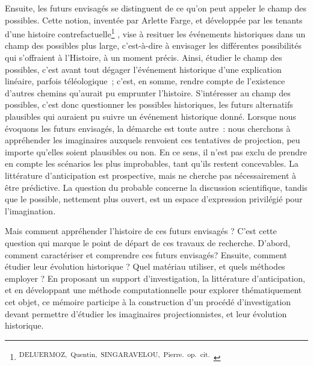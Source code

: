 \documentclass[letterpaper,portrait,12pt]{article}
\begin{document}
	Ensuite, les futurs envisag\'{e}s se distinguent de ce qu'on peut appeler le champ des possibles. Cette notion, invent\'{e}e par Arlette Farge, et d\'{e}velopp\'{e}e par les tenants d'une histoire contrefactuelle\footnote{\textsuperscript{\newpage
}\textsuperscript{	DELUERMOZ,\ Quentin,\ SINGARAVELOU,\ Pierre.\ op.\ cit.\ }} , vise \`{a} resituer les \'{e}v\'{e}nements historiques dans un champ des possibles plus large, c'est-\`{a}-dire \`{a} envisager les diff\'{e}rentes possibilit\'{e}s qui s'offraient \`{a} l'Histoire, \`{a} un moment pr\'{e}cis. Ainsi, \'{e}tudier le champ des possibles, c'est avant tout d\'{e}gager l'\'{e}v\'{e}nement historique d'une explication lin\'{e}aire, parfois t\'{e}l\'{e}ologique ; c'est, en somme, rendre compte de l'existence d'autres chemins qu'aurait pu emprunter l'histoire. S'int\'{e}resser au champ des possibles, c'est donc questionner les possibles historiques, les futurs alternatifs plausibles qui auraient pu suivre un \'{e}v\'{e}nement historique donn\'{e}. Lorsque nous \'{e}voquons les futurs envisag\'{e}s, la d\'{e}marche est toute autre : nous cherchons \`{a} appr\'{e}hender les imaginaires auxquels renvoient ces tentatives de projection, peu importe qu'elles soient plausibles ou non. En ce sens, il n'est pas exclu de prendre en compte les sc\'{e}narios les plus improbables, tant qu'ils restent concevables. La litt\'{e}rature d'anticipation est prospective, mais ne cherche pas n\'{e}cessairement \`{a} \^{e}tre pr\'{e}dictive. La question du probable concerne la discussion scientifique, tandis que le possible, nettement plus ouvert, est un espace d'expression privil\'{e}gi\'{e} pour l'imagination. 





	Mais comment appr\'{e}hender l'histoire de ces futurs envisag\'{e}s ? C'est cette question qui marque le point de d\'{e}part de ces travaux de recherche. D'abord, comment caract\'{e}riser et comprendre ces futurs envisag\'{e}s? Ensuite, comment \'{e}tudier leur \'{e}volution historique ? Quel mat\'{e}riau utiliser, et quels m\'{e}thodes employer ? En proposant un support d'investigation, la litt\'{e}rature d'anticipation, et en d\'{e}veloppant une m\'{e}thode computationnelle pour explorer th\'{e}matiquement cet objet, ce m\'{e}moire participe \`{a} la construction d'un proc\'{e}d\'{e} d'investigation devant permettre d'\'{e}tudier les imaginaires projectionnistes, et leur \'{e}volution historique.
\end{document}
